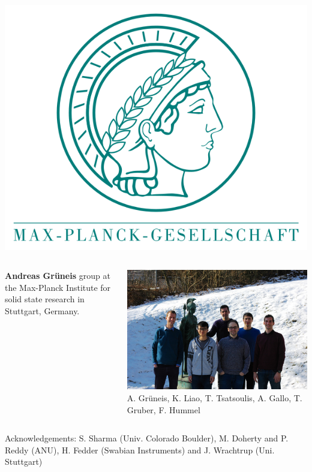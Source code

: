 \begin{frame}{}
  \includegraphics[width=.2\textwidth]{images/max_planck.png}\\
  \begin{columns}
    \begin{column}{0.5\textwidth}
      \textbf{Andreas Grüneis} group at the Max-Planck Institute for solid
      state research in Stuttgart, Germany.
    \end{column}
    \begin{column}{0.5\textwidth}
      \includegraphics[width=\textwidth]{images/group_photo.jpg}\\
      {\tiny
        A. Grüneis, K. Liao, T. Tsatsoulis, A. Gallo, T. Gruber, F. Hummel
      }
    \end{column}
  \end{columns}
  Acknowledgements:
  S. Sharma (Univ. Colorado Boulder), M. Doherty and P. Reddy (ANU), H. Fedder
  (Swabian Instruments) and J.  Wrachtrup (Uni. Stuttgart)
\end{frame}

